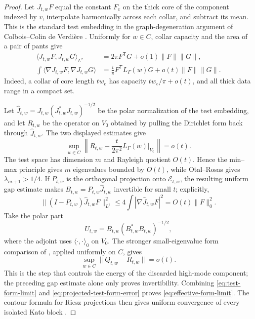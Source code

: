 \documentclass[11pt,reqno]{amsart}
\theoremstyle{definition}
\theoremstyle{remark}
\begin{document}
\begin{proof}
Let $J_{t,w}F$ equal the constant $F_v$ on the thick core of the component
indexed by $v$, interpolate harmonically across each collar, and subtract
its mean.  This is the standard test embedding in the graph-degeneration
argument of Colbois--Colin de Verdi\`ere
\cite[Lemma~V.1]{ColboisCdV1988}.  Uniformly for $w\in C$, collar capacity
and the area of a pair of pants give
\begin{align*}
 \langle J_{t,w}F,J_{t,w}G\rangle_{L^2}
   &=2\pi F^{\mathsf T}G+o(1)\|F\|\|G\|,\\
 \int\langle\nabla J_{t,w}F,\nabla J_{t,w}G\rangle
   &=\frac{t}{\pi}F^{\mathsf T}L_\Gamma(w)G
     +o(t)\|F\|\|G\|.
\end{align*}
Indeed, a collar of core length $tw_e$ has capacity
$tw_e/\pi+o(t)$, and all thick data range in a compact set.

Let
$\widehat J_{t,w}=J_{t,w}(J_{t,w}^{*}J_{t,w})^{-1/2}$ be the polar
normalization of the test embedding, and let $R_{t,w}$ be the operator on
$V_0$ obtained by pulling the Dirichlet form back through $\widehat J_{t,w}$.
The two displayed estimates give
\begin{equation}\label{eq:test-form-limit}
 \sup_{w\in C}\left\|
 R_{t,w}-\frac{t}{2\pi^2}L_\Gamma(w)|_{V_0}
 \right\|=o(t).
\end{equation}
The test space has dimension $m$ and Rayleigh quotient $O(t)$.  Hence the
min--max principle gives $m$ eigenvalues bounded by $O(t)$, while
Otal--Rosas gives $\lambda_{m+1}>1/4$.  If $P_{t,w}$ is the orthogonal
projection onto $\mathcal E_{t,w}$, the resulting uniform gap estimate makes
$B_{t,w}=P_{t,w}\widehat J_{t,w}$ invertible for small $t$; explicitly,
\[
 \|(I-P_{t,w})\widehat J_{t,w}F\|_{L^2}^2
 \le 4\int|\nabla\widehat J_{t,w}F|^2
 =O(t)\|F\|_0^2.
\]
Take the polar part
\[
 U_{t,w}=B_{t,w}(B_{t,w}^{*}B_{t,w})^{-1/2},
\]
where the adjoint uses $\langle\cdot,\cdot\rangle_0$ on $V_0$.
The stronger small-eigenvalue form comparison of
\cite[Lemma~V.1]{ColboisCdV1988}, applied uniformly on $C$, gives
\begin{equation}\label{eq:projected-test-form-error}
 \sup_{w\in C}\|Q_{t,w}-R_{t,w}\|=o(t).
\end{equation}
This is the step that controls the energy of the discarded high-mode
component; the preceding gap estimate alone only proves invertibility.
Combining \eqref{eq:test-form-limit} and
\eqref{eq:projected-test-form-error} proves
\eqref{eq:effective-form-limit}.  The contour formula for Riesz projections
then gives uniform convergence of every isolated Kato block
\cite{Kato1995}.
\end{proof}
\end{document}
